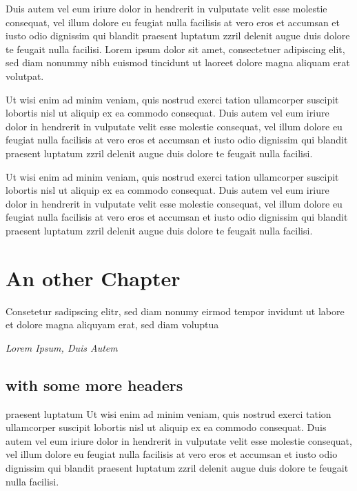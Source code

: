\documentclass[10pt,twoside,twocolumn,openany,nodeprecatedcode]{dndbook}
\begin{document}
Duis autem vel eum iriure dolor in hendrerit in vulputate velit esse molestie consequat, vel illum dolore eu feugiat nulla facilisis at vero eros et accumsan et iusto odio dignissim qui blandit praesent luptatum zzril delenit augue duis dolore te feugait nulla facilisi. Lorem ipsum dolor sit amet, consectetuer adipiscing elit, sed diam nonummy nibh euismod tincidunt ut laoreet dolore magna aliquam erat volutpat. 

\begin{DndReadAloud}{}
Ut wisi enim ad minim veniam, quis nostrud exerci tation ullamcorper suscipit lobortis nisl ut aliquip ex ea commodo consequat. Duis autem vel eum iriure dolor in hendrerit in vulputate velit esse molestie consequat, vel illum dolore eu feugiat nulla facilisis at vero eros et accumsan et iusto odio dignissim qui blandit praesent luptatum zzril delenit augue duis dolore te feugait nulla facilisi. 

\end{DndReadAloud}

\begin{DndComment}{}
Ut wisi enim ad minim veniam, quis nostrud exerci tation ullamcorper suscipit lobortis nisl ut aliquip ex ea commodo consequat. Duis autem vel eum iriure dolor in hendrerit in vulputate velit esse molestie consequat, vel illum dolore eu feugiat nulla facilisis at vero eros et accumsan et iusto odio dignissim qui blandit praesent luptatum zzril delenit augue duis dolore te feugait nulla facilisi. 

\end{DndComment}

\chapter{An other Chapter}

\begingroup
\DndSetThemeColor[DmgLavender]\begin{DndSidebar}{}
Consetetur sadipscing elitr, sed diam nonumy eirmod tempor invidunt ut labore et dolore magna aliquyam erat, sed diam voluptua

\textit{Lorem Ipsum, Duis Autem}
\end{DndSidebar}
\endgroup
\section{with some more headers}

\begin{DndComment}{praesent luptatum}
Ut wisi enim ad minim veniam, quis nostrud exerci tation ullamcorper suscipit lobortis nisl ut aliquip ex ea commodo consequat. Duis autem vel eum iriure dolor in hendrerit in vulputate velit esse molestie consequat, vel illum dolore eu feugiat nulla facilisis at vero eros et accumsan et iusto odio dignissim qui blandit praesent luptatum zzril delenit augue duis dolore te feugait nulla facilisi. 

\end{DndComment}
\end{document}
